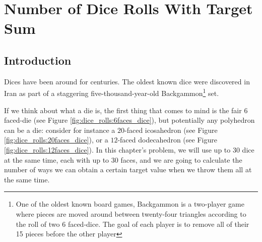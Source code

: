 %

\chapter{Number of Dice Rolls With Target Sum}
\label{ch:dice_rolls}
\section*{Introduction}

Dices have been around for centuries. The oldest known dice were discovered in Iran as part of a staggering five-thousand-year-old
 Backgammon\footnote{One of the oldest known board games, Backgammon is  a two-player game where pieces are moved around between twenty-four triangles according to the roll of two 6 faced-dice. The goal of each player is to remove all of their 15 pieces before the other player} set.

If we think about what a die is, the first thing that comes to mind is the fair $6$ faced-die (see Figure \ref{fig:dice_rolls:6faces_dice}), but potentially any polyhedron can be a die: consider for instance a  $20$-faced icosahedron (see Figure
\ref{fig:dice_rolls:20faces_dice}), or a $12$-faced dodecahedron (see Figure
\ref{fig:dice_rolls:12faces_dice}).
In this chapter's problem, we will use up to $30$ dice at the same time,
each with up to $30$ faces, and we are going to calculate the number of ways we can obtain a certain
target value when we throw them all at the same time.


